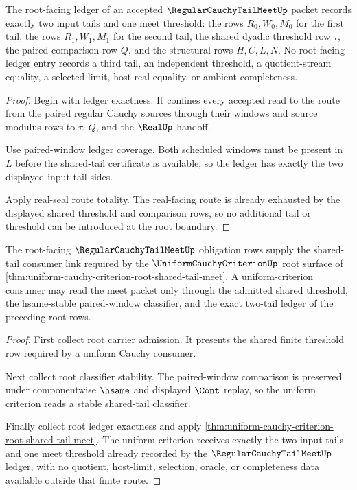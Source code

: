 \begin{theorem}
\label{thm:regular-cauchy-tail-meet-root-ledger-exactness}
The root-facing ledger of an accepted $\RegularCauchyTailMeetUp$ packet records exactly two input tails and one meet threshold: the rows $R_0,W_0,M_0$ for the first tail, the rows $R_1,W_1,M_1$ for the second tail, the shared dyadic threshold row $\tau$, the paired comparison row $Q$, and the structural rows $H,C,L,N$. No root-facing ledger entry records a third tail, an independent threshold, a quotient-stream equality, a selected limit, host real equality, or ambient completeness.
\end{theorem}
\begin{proof}
Begin with ledger exactness. It confines every accepted read to the route from the paired regular Cauchy sources through their windows and source modulus rows to $\tau$, $Q$, and the $\RealUp$ handoff.

Use paired-window ledger coverage. Both scheduled windows must be present in $L$ before the shared-tail certificate is available, so the ledger has exactly the two displayed input-tail sides.

Apply real-seal route totality. The real-facing route is already exhausted by the displayed shared threshold and comparison rows, so no additional tail or threshold can be introduced at the root boundary.
\end{proof}

\begin{theorem}
\label{thm:regular-cauchy-tail-meet-uniform-criterion-consumer-link}
The root-facing $\RegularCauchyTailMeetUp$ obligation rows supply the shared-tail consumer link required by the $\UniformCauchyCriterionUp$ root surface of \autoref{thm:uniform-cauchy-criterion-root-shared-tail-meet}. A uniform-criterion consumer may read the meet packet only through the admitted shared threshold, the hsame-stable paired-window classifier, and the exact two-tail ledger of the preceding root rows.
\end{theorem}
\begin{proof}
First collect root carrier admission. It presents the shared finite threshold row required by a uniform Cauchy consumer.

Next collect root classifier stability. The paired-window comparison is preserved under componentwise $\hsame$ and displayed $\Cont$ replay, so the uniform criterion reads a stable shared-tail classifier.

Finally collect root ledger exactness and apply \autoref{thm:uniform-cauchy-criterion-root-shared-tail-meet}. The uniform criterion receives exactly the two input tails and one meet threshold already recorded by the $\RegularCauchyTailMeetUp$ ledger, with no quotient, host-limit, selection, oracle, or completeness data available outside that finite route.
\end{proof}

